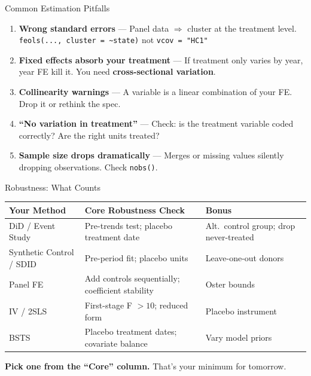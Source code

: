 \begin{frame}{Common Estimation Pitfalls}
  \small
  \begin{enumerate}
    \item \textbf{Wrong standard errors} ---
      Panel data $\Rightarrow$ cluster at the treatment level. \texttt{feols(..., cluster = \textasciitilde{}state)} not \texttt{vcov = "HC1"}

    \item \textbf{Fixed effects absorb your treatment} ---
      If treatment only varies by year, year FE kill it. You need \textbf{cross-sectional variation}.

    \item \textbf{Collinearity warnings} ---
      A variable is a linear combination of your FE. Drop it or rethink the spec.

    \item \textbf{``No variation in treatment''} ---
      Check: is the treatment variable coded correctly? Are the right units treated?

    \item \textbf{Sample size drops dramatically} ---
      Merges or missing values silently dropping observations. Check \texttt{nobs()}.
  \end{enumerate}
\end{frame}

\begin{frame}{Robustness: What Counts}
  \small
  \begin{tabular}{@{}p{2.8cm}p{4.2cm}p{3.5cm}@{}}
    \toprule
    \textbf{Your Method} & \textbf{Core Robustness Check} & \textbf{Bonus} \\
    \midrule
    DiD / Event Study & Pre-trends test; placebo treatment date & Alt.\ control group; drop never-treated \\[4pt]
    Synthetic Control / SDID & Pre-period fit; placebo units & Leave-one-out donors \\[4pt]
    Panel FE & Add controls sequentially; coefficient stability & Oster bounds \\[4pt]
    IV / 2SLS & First-stage F $> 10$; reduced form & Placebo instrument \\[4pt]
    BSTS & Placebo treatment dates; covariate balance & Vary model priors \\
    \bottomrule
  \end{tabular}

  \vspace{6pt}

  \textbf{Pick one from the ``Core'' column.} That's your minimum for tomorrow.
\end{frame}

